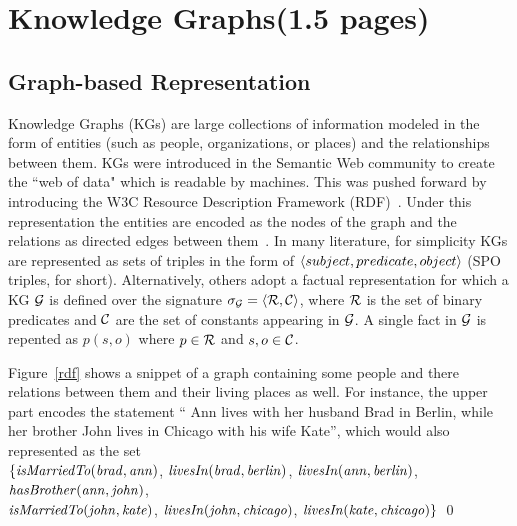 \section{Knowledge Graphs(1.5 pages)}
\label{sec:kgs}

\subsection{Graph-based Representation}
Knowledge Graphs (KGs) are large collections of information modeled in the form of entities (such as people, organizations, or places) and the relationships between them. KGs were introduced in the Semantic Web community to create the ``web of data" which is readable by machines. This was pushed forward by introducing the W3C Resource Description Framework (RDF)~\cite{rdf2004}. Under this representation the entities are encoded as the nodes of the graph and the relations as directed edges between them~\cite{Nickel2015ARO}. In many literature, for simplicity KGs are represented as sets of triples in the form of $\langle subject, predicate,object\rangle$ (SPO triples, for short). Alternatively, %
others adopt a factual representation for which a KG $\mathcal{G}$ is defined over the signature $\sigma_{\mathcal{G}}=\langle\mathcal{R},\mathcal{C}\rangle$, where $\mathcal{R}$ is the set of binary predicates and $\mathcal{C}$  are the set of constants appearing in $\mathcal{G}$.  A single fact in $\mathcal{G}$ is repented as $p(s,o)$ where $p \in \mathcal{R}$ and $s,o \in \mathcal{C}$. 

\begin{example} Figure~\ref{rdf} shows a snippet of a graph containing some people and there relations between them and their living places as well. For instance, the upper part encodes the statement `` Ann lives with her husband Brad in Berlin, while her brother John lives in Chicago with his wife Kate'', which would also represented as the set \\$\{ \mathit{isMarriedTo(brad, ann)}$,  $\mathit{livesIn(brad, berlin)}$, $\mathit{livesIn(ann, berlin)}$,\\ $\mathit{hasBrother(ann, john)}$,\\ $\mathit{isMarriedTo(john, kate)}$, $\mathit{livesIn(john, chicago)}$, $\mathit{livesIn(kate, chicago)} \}$ \qed
\end{example}





